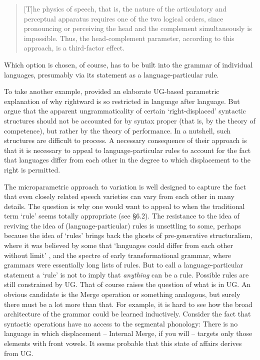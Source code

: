\documentclass[output=paper,
modfonts
]{LSP/langsci}
\begin{document}
\begin{quote}
{[}T{]}he physics of speech, that is, the nature of the articulatory and
perceptual apparatus requires one of the two logical orders, since
pronouncing or perceiving the head and the complement simultaneously is
impossible. Thus, the head-complement parameter, according to this
approach, is a third-factor effect. \citep[4]{trotzke2013}
\end{quote}

Which option is chosen, of course, has to be built into the grammar of
individual languages, presumably via its statement as a
language-particular rule.

To take another example, \citet{kayne1994} provided an elaborate UG-based
parametric explanation of why rightward  is so restricted in
language after language. But \citet{ackema2002} argue that the
apparent ungrammaticality of certain `right-displaced' syntactic
structures should not be accounted for by syntax proper (that is, by the
theory of competence), but rather by the theory of performance. In a
nutshell, such structures are difficult to process. A necessary
consequence of their approach is that it is necessary to appeal to
language-particular rules to account for the fact that languages differ
from each other in the degree to which displacement to the right is
permitted.

The microparametric approach to variation is well designed to capture
the fact that even closely related speech varieties can vary from each
other in many details. The question is why one would want to appeal to
 when the traditional term `rule' seems totally
appropriate (see §6.2). The resistance to the idea of reviving the idea
of (language-particular) rules is unsettling to some, perhaps because
the idea of `rules' brings back the ghosts of pre-generative
structuralism, where it was believed by some that `languages could
differ from each other without limit' \citep[96]{joos1957}, and the spectre
of early transformational grammar, where grammars were essentially long
lists of rules. But to call a language-particular statement a `rule' is
not to imply that \emph{anything} can be a rule. Possible rules are
still constrained by UG. That of course raises the question of what is
in UG. An obvious candidate is the Merge operation or something
analogous, but surely there must be a lot more than that. For example,
it is hard to see how the broad architecture of the grammar could be
learned inductively. Consider the fact that syntactic operations have no
access to the segmental phonology: There is no language in which
displacement  --  Internal Merge, if you will  --  targets only those
elements with front vowels. It seems probable that this state of affairs
derives from UG.
\end{document}
